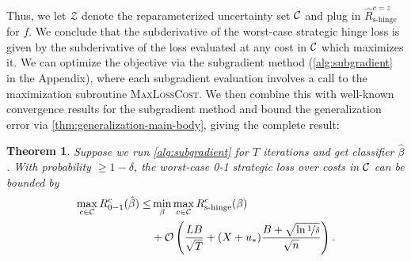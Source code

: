 \documentclass{article}
\newcommand{\costset}{\gC}
\newcommand{\costfunc}{c}
\newcommand{\shingeemprisk}{\hat R_{\textrm{s-hinge}}}
\newcommand{\shingepoprisk}{R_{\textrm{s-hinge}}}
\newcommand{\uinv}{\ensuremath{u_{*}}}
\newcommand{\cinc}{{\costfunc\in\costset}}
\newtheorem{theorem}{Theorem}[section]
\theoremstyle{definition}
\begin{document}
Thus, we let $\mathcal{Z}$ denote the reparameterized uncertainty set $\costset$ and plug in $\shingeemprisk^{c=z}$ for $f$. We conclude that the subderivative of the worst-case strategic hinge loss is given by the subderivative of the loss evaluated at any cost in $\costset$ which maximizes it.
We can optimize the objective via the subgradient method (\cref{alg:subgradient} in the Appendix), where each subgradient evaluation involves a call to the maximization subroutine \textsc{MaxLossCost}.
We then combine this with well-known convergence results for the subgradient method and bound the generalization error via \cref{thm:generalization-main-body}, giving the complete result:
\begin{theorem}
    \label{thm:subgradient}
    Suppose we run \cref{alg:subgradient} for $T$ iterations and get classifier $\hat\beta$. With probability $\geq 1-\delta$, the worst-case 0-1 strategic loss over costs in $\costset$ can be bounded by
    \begin{align*}
    \max_{\cinc} R_{0-1}^{\costfunc}(\hat\beta) \leq &
     \min_{\beta} \max_{\cinc} \shingepoprisk^{\costfunc}(\beta) \\
     & + \mathcal{O}\left(\frac{LB}{\sqrt{T}} + (X+\uinv) \frac{B + \sqrt{\ln \nicefrac{1}{\delta}}}{\sqrt{n}} \right).
    \end{align*}
\end{theorem}
\end{document}
